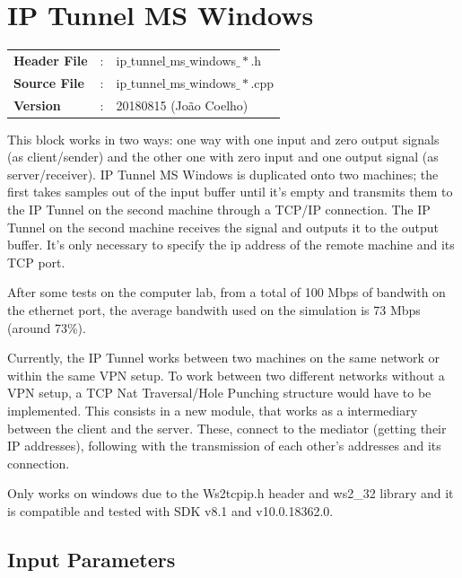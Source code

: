 \clearpage

\section{IP Tunnel MS Windows}

\begin{tcolorbox}	
	\begin{tabular}{p{2.75cm} p{0.2cm} p{10.5cm}} 	
		\textbf{Header File}   &:& ip$\_$tunnel$\_$ms$\_$windows$\_*$.h \\
		\textbf{Source File}   &:& ip$\_$tunnel$\_$ms$\_$windows$\_*$.cpp \\
        \textbf{Version}       &:& 20180815 (Jo\~ao Coelho) \\
	\end{tabular}
\end{tcolorbox}

This block works in two ways: one way with one input and zero output signals (as client/sender) and the other one with zero input and one output signal (as server/receiver).
IP Tunnel MS Windows is duplicated onto two machines; the first takes samples out of the input buffer until it's empty and transmits them to the IP Tunnel on the second machine through a TCP/IP connection. The IP Tunnel on the second machine receives the signal and outputs it to the output buffer.
It's only necessary to specify the ip address of the remote machine and its TCP port. \par
After some tests on the computer lab, from a total of 100 Mbps of bandwith on the ethernet port, the average bandwith used on the simulation is 73 Mbps (around 73\%). 
\par
Currently, the IP Tunnel works between two machines on the same network or within the same VPN setup.
To work between two different networks without a VPN setup, a TCP Nat Traversal/Hole Punching structure would have to be implemented. This consists in a new module, that works as a intermediary between the client and the server. These, connect to the mediator (getting their IP addresses), following with the transmission of each other's addresses and its connection.
\par
Only works on windows due to the Ws2tcpip.h header and ws2\_32 library and it is compatible and tested with SDK v8.1 and v10.0.18362.0.

\subsection*{Input Parameters}

